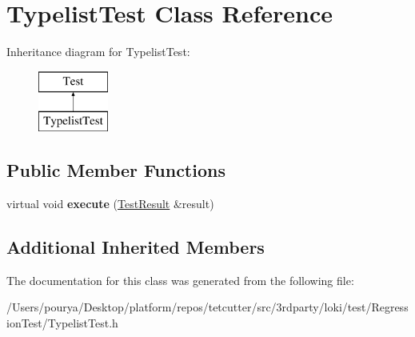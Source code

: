 \hypertarget{classTypelistTest}{}\section{Typelist\+Test Class Reference}
\label{classTypelistTest}
Inheritance diagram for Typelist\+Test\+:\begin{figure}[H]
\begin{center}
\leavevmode
\includegraphics[height=2.000000cm]{classTypelistTest}
\end{center}
\end{figure}
\subsection*{Public Member Functions}
\begin{DoxyCompactItemize}
\item 
\hypertarget{classTypelistTest_a0c8cad9f8a23c4e4c923c8ea7020b46b}{}virtual void {\bfseries execute} (\hyperlink{classTestResult}{Test\+Result} \&result)\label{classTypelistTest_a0c8cad9f8a23c4e4c923c8ea7020b46b}

\end{DoxyCompactItemize}
\subsection*{Additional Inherited Members}


The documentation for this class was generated from the following file\+:\begin{DoxyCompactItemize}
\item 
/\+Users/pourya/\+Desktop/platform/repos/tetcutter/src/3rdparty/loki/test/\+Regression\+Test/Typelist\+Test.\+h\end{DoxyCompactItemize}
